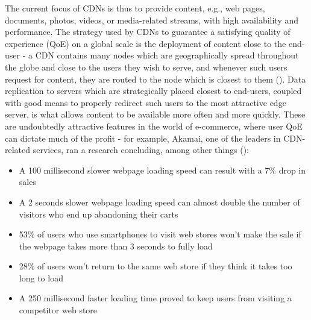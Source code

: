     The current focus of CDNs is thus to provide content, e.g., web pages, documents, photos, videos, or media-related streams, with high availability and performance.
    The strategy used by CDNs to guarantee a satisfying quality of experience (QoE) on a global scale is the deployment of content close to the end-user - a CDN contains many nodes which are geographically spread throughout the globe and close to the users they wish to serve, and whenever such users request for content, they are routed to the node which is closest to them (\cite{cookbook}).
    Data replication to servers which are strategically placed closest to end-users, coupled with good means to properly redirect such users to the most attractive edge server, is what allows content to be available more often and more quickly.
    These are undoubtedly attractive features in the world of e-commerce, where user QoE can dictate much of the profit - for example, Akamai, one of the leaders in CDN-related services, ran a research concluding, among other things (\cite{akamai}):

\begin{itemize}
    \item A 100 millisecond slower webpage loading speed can result with a 7\% drop in sales
    \item A 2 seconds slower webpage loading speed can almost double the number of visitors who end up abandoning their carts
    \item 53\% of users who use smartphones to visit web stores won’t make the sale if the webpage takes more than 3 seconds to fully load
    \item 28\% of users won’t return to the same web store if they think it takes too long to load
    \item A 250 millisecond faster loading time proved to keep users from visiting a competitor web store
\end{itemize}{}


